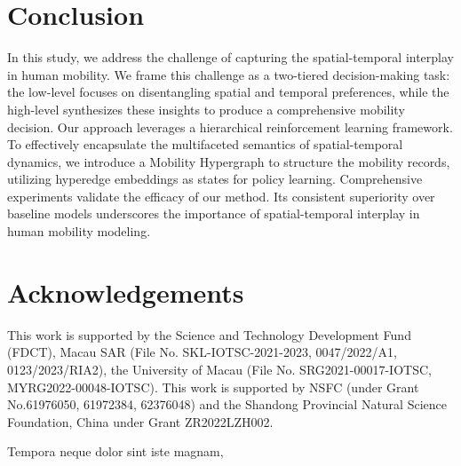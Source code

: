 \documentclass[letterpaper]{article} %
\begin{document}
\section{Conclusion}
In this study, we address the challenge of capturing the spatial-temporal interplay in human mobility.
We frame this challenge as a two-tiered decision-making task: the low-level focuses on disentangling spatial and temporal preferences, while the high-level synthesizes these insights to produce a comprehensive mobility decision.
Our approach leverages a hierarchical reinforcement learning framework.
To effectively encapsulate the multifaceted semantics of spatial-temporal dynamics, we introduce a Mobility Hypergraph to structure the mobility records, utilizing hyperedge embeddings as states for policy learning.
Comprehensive experiments validate the efficacy of our method.
Its consistent superiority over baseline models underscores the importance of spatial-temporal interplay in human mobility modeling.

\section{Acknowledgements}
This work is supported by the Science and Technology Development Fund (FDCT), Macau SAR (File No. SKL-IOTSC-2021-2023, 0047/2022/A1, 0123/2023/RIA2), the University of Macau (File No. SRG2021-00017-IOTSC, MYRG2022-00048-IOTSC).
This work is supported by NSFC (under Grant No.61976050, 61972384, 62376048) and the Shandong Provincial Natural Science Foundation, China under Grant ZR2022LZH002.

Tempora neque dolor sint iste magnam,

\end{document}
